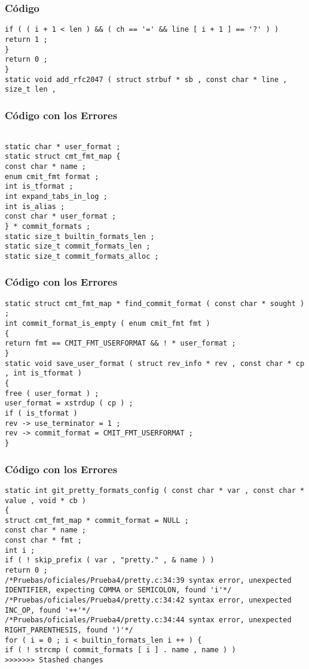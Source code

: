 \documentclass{beamer}
\begin{document}
\begin{frame}[fragile]
\frametitle{C\'odigo}
\begin{verbatim}
if ( ( i + 1 < len ) && ( ch == '=' && line [ i + 1 ] == '?' ) ) 
return 1 ; 
} 
return 0 ; 
} 
static void add_rfc2047 ( struct strbuf * sb , const char * line , size_t len , \end{verbatim}
\end{frame}
\begin{frame}[fragile]
\frametitle{C\'odigo con los Errores}
\begin{verbatim}

static char * user_format ; 
static struct cmt_fmt_map { 
const char * name ; 
enum cmit_fmt format ; 
int is_tformat ; 
int expand_tabs_in_log ; 
int is_alias ; 
const char * user_format ; 
} * commit_formats ; 
static size_t builtin_formats_len ; 
static size_t commit_formats_len ; 
static size_t commit_formats_alloc ; 
\end{verbatim}
\end{frame}
\begin{frame}[fragile]
\frametitle{C\'odigo con los Errores}
\begin{verbatim}
static struct cmt_fmt_map * find_commit_format ( const char * sought ) ; 
int commit_format_is_empty ( enum cmit_fmt fmt ) 
{ 
return fmt == CMIT_FMT_USERFORMAT && ! * user_format ; 
} 
static void save_user_format ( struct rev_info * rev , const char * cp , int is_tformat ) 
{ 
free ( user_format ) ; 
user_format = xstrdup ( cp ) ; 
if ( is_tformat ) 
rev -> use_terminator = 1 ; 
rev -> commit_format = CMIT_FMT_USERFORMAT ; 
} 
\end{verbatim}
\end{frame}
\begin{frame}[fragile]
\frametitle{C\'odigo con los Errores}
\begin{verbatim}
static int git_pretty_formats_config ( const char * var , const char * value , void * cb ) 
{ 
struct cmt_fmt_map * commit_format = NULL ; 
const char * name ; 
const char * fmt ; 
int i ; 
if ( ! skip_prefix ( var , "pretty." , & name ) ) 
return 0 ; 
/*Pruebas/oficiales/Prueba4/pretty.c:34:39 syntax error, unexpected IDENTIFIER, expecting COMMA or SEMICOLON, found 'i'*/
/*Pruebas/oficiales/Prueba4/pretty.c:34:42 syntax error, unexpected INC_OP, found '++'*/
/*Pruebas/oficiales/Prueba4/pretty.c:34:44 syntax error, unexpected RIGHT_PARENTHESIS, found ')'*/
for ( i = 0 ; i < builtin_formats_len i ++ ) { 
if ( ! strcmp ( commit_formats [ i ] . name , name ) ) 
>>>>>>> Stashed changes
\end{verbatim}
\end{frame}
\end{document}

